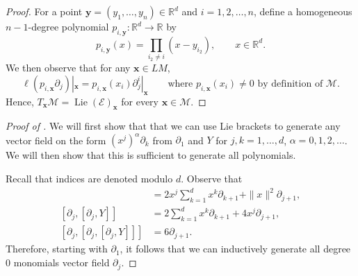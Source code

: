 \documentclass[10pt]{amsart}
\theoremstyle{remark}
\DeclareMathOperator{\Lie}{Lie}
\newcommand{\E}{\mathcal{E}}
\newcommand{\LM}{\mathcal{M}}
\numberwithin{equation}{section}
\begin{document}


\begin{proof}
For a point $\mathbf{y} =(y_1, \dots, y_n) \in \mathbb{R}^d$ and $i=1, 2,\dots, n$, define a homogeneous $n-1$-degree polynomial $p_{i,\mathbf{y}}: \mathbb{R}^d \to \mathbb{R}$ by
$$p_{i,\mathbf{y}}(x) = \prod_{i_2 \neq i} (x-y_{i_2}), \qquad x \in \mathbb{R}^d.$$
We then observe that for any $\mathbf{x} \in LM$,
$$\ell(p_{i,\mathbf{x}}\partial_j)|_{\mathbf{x}} = p_{i,\mathbf{x}}(x_i) \partial_{j}^i|_{\mathbf{x}} \qquad \text{where $p_{i,\mathbf{x}}(x_i) \neq 0$ by definition of $\LM$}.$$
Hence, $T_{\mathbf{x}} \LM = \Lie(\E)_{\mathbf{x}}$ for every $\mathbf{x} \in \LM$.
\end{proof}



\begin{proof}[Proof of ]
We will first show that that we can use Lie brackets to generate any vector field on the form $(x^j)^\alpha \partial_k$ from $\partial_1$ and $Y$ for $j,k =1, \dots, d$, $\alpha = 0,1, 2, \dots$. We will then show that this is sufficient to generate all polynomials.

Recall that indices are denoted modulo $d$. Observe that
\begin{align}
[\partial_j, Y] &= 2 x^j \sum_{k=1}^d x^k \partial_{k+1} + \|x\|^2 \partial_{j+1}, \\
[\partial_j, [\partial_j, Y]] &= 2 \sum_{k=1}^d x^k \partial_{k+1} + 4 x^j \partial_{j+1}  ,\\
[\partial_j, [\partial_j, [\partial_j, Y]]] &= 6\partial_{j+1}.
\end{align}
Therefore, starting with $\partial_1$, it follows that we can inductively generate all degree 0 monomials vector field $\partial_j$.


\end{proof}
\end{document}
